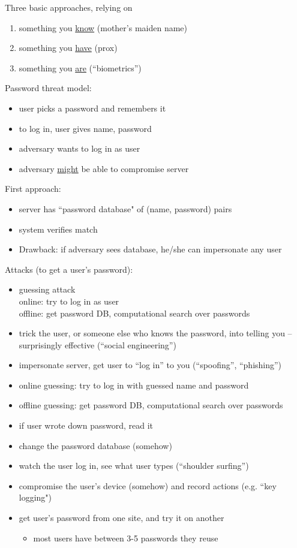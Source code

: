 Three basic approaches, relying on
\begin{enumerate}
    \item something you \underline{know} (mother's maiden name)
    \item something you \underline{have} (prox)
    \item something you \underline{are} (``biometrics'')
\end{enumerate}
Password threat model:
\begin{itemize}
    \item user picks a password and remembers it
    \item to log in, user gives name, password
    \item adversary wants to log in as user
    \item adversary \underline{might} be able to compromise server
\end{itemize}
First approach:
\begin{itemize}
    \item server has ``password database" of (name, password) pairs
    \item system verifies match
    \item Drawback: if adversary sees database, he/she can impersonate any user
\end{itemize}
Attacks (to get a user's password):
\begin{itemize}
    \item guessing attack\\
        online: try to log in as user\\
        offline: get password DB, computational search over passwords
    \item trick the user, or someone else who knows the password, into telling you -- surprisingly effective (``social
            engineering'')
    \item impersonate server, get user to ``log in'' to you (``spoofing'',
            ``phishing'')
    \item online guessing: try to log in with guessed name and password
    \item offline guessing: get password DB, computational search over passwords
    \item if user wrote down password, read it
    \item change the password database (somehow)
    \item watch the user log in, see what user types (``shoulder surfing'')
    \item compromise the user's device (somehow) and record actions (e.g. ``key logging")
    \item get user's password from one site, and try it on another
    	\begin{itemize}
		\item most users have between 3-5 passwords they reuse
	\end{itemize}
\end{itemize}

